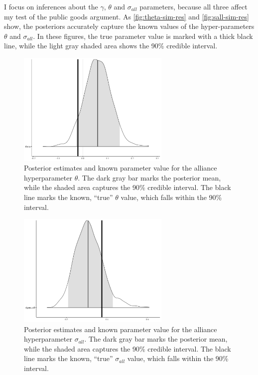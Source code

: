 \documentclass[12pt]{article}
\begin{document}
I focus on inferences about the $\gamma$, $\theta$ and $\sigma_{all}$ parameters, because all three affect my test of the public goods argument. 
As \autoref{fig:theta-sim-res} and \autoref{fig:sall-sim-res} show, the posteriors accurately capture the known values of the hyper-parameters $\theta$ and $\sigma_{all}$. 
In these figures, the true parameter value is marked with a thick black line, while the light gray shaded area shows the 90\% credible interval. 


\begin{figure}[htbp]
	\centering
		\includegraphics[width=0.65\textwidth]{theta-sim-res.pdf}
	\caption{Posterior estimates and known parameter value for the alliance hyperparameter $\theta$. The dark gray bar marks the posterior mean, while the shaded area captures the 90\% credible interval. The black line marks the known, ``true'' $\theta$ value, which falls within the 90\% interval.}
	\label{fig:theta-sim-res}
\end{figure}


\begin{figure}[htbp]
	\centering
		\includegraphics[width=0.65\textwidth]{sall-sim-res.pdf}
	\caption{Posterior estimates and known parameter value for the alliance hyperparameter $\sigma_{all}$. The dark gray bar marks the posterior mean, while the shaded area captures the 90\% credible interval. The black line marks the known, ``true'' $\sigma_{all}$ value, which falls within the 90\% interval.}
	\label{fig:sall-sim-res}
\end{figure}
\end{document}
